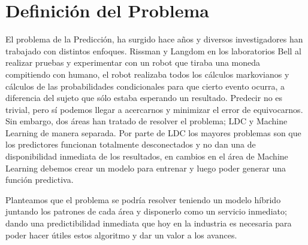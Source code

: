

\section{Definición del Problema}


El problema de la Predicción, ha surgido hace años y diversos investigadores han trabajado con distintos enfoques. Rissman \cite{Rissanen1983} y Langdom \cite{Langdon1983} en los laboratorios Bell al realizar pruebas y experimentar con un robot que tiraba una moneda compitiendo con humano, el robot realizaba todos los cálculos markovianos y cálculos de las probabilidades condicionales para que cierto evento ocurra, a diferencia del sujeto que sólo estaba esperando un resultado.
Predecir no es trivial, pero sí podemos llegar a acercarnos y minimizar el error de equivocarnos. Sin embargo, dos áreas han tratado de resolver el problema; LDC y Machine Learning de manera separada. Por parte de LDC los mayores problemas son que los predictores funcionan totalmente desconectados y no dan una de disponibilidad inmediata de los resultados, en cambios en el área de Machine Learning debemos crear un modelo para entrenar y luego poder generar una función predictiva. 

Planteamos que el problema se podría resolver teniendo un modelo híbrido juntando los patrones de cada área y disponerlo como un servicio inmediato; dando una predictibilidad inmediata que hoy en la industria es necesaria para poder hacer útiles estos algoritmo y dar un valor a los avances.
 